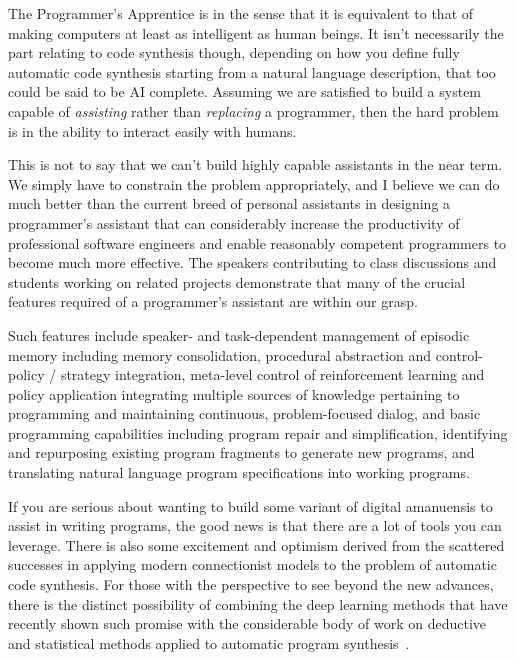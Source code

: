 The Programmer's Apprentice is {} in the sense that it is equivalent to that of making computers at least as intelligent as human beings. It isn't necessarily the part relating to code synthesis \emdash{} though, depending on how you define fully automatic code synthesis starting from a natural language description, that too could be said to be AI complete. Assuming we are satisfied to build a system capable of {\it{assisting}} rather than {\it{replacing}} a programmer, then the hard problem is in the ability to interact easily with humans.

This is not to say that we can't build highly capable assistants in the near term. We simply have to constrain the problem appropriately, and I believe we can do much better than the current breed of personal assistants in designing a programmer's assistant that can considerably increase the productivity of professional software engineers and enable reasonably competent programmers to become much more effective. The speakers contributing to class discussions and students working on related projects demonstrate that many of the crucial features required of a programmer's assistant are within our grasp.

Such features include speaker- and task-dependent management of episodic memory including memory consolidation, procedural abstraction and control-policy / strategy integration, meta-level control of reinforcement learning and policy application integrating multiple sources of knowledge pertaining to programming and maintaining continuous, problem-focused dialog, and basic programming capabilities including program repair and simplification, identifying and repurposing existing program fragments to generate new programs, and translating natural language program specifications into working programs.

If you are serious about wanting to build some variant of digital amanuensis to assist in writing programs, the good news is that there are a lot of tools you can leverage. There is also some excitement and optimism derived from the scattered successes in applying modern connectionist models to the problem of automatic code synthesis. For those with the perspective to see beyond the new advances, there is the distinct possibility of combining the deep learning methods that have recently shown such promise with the considerable body of work on deductive and statistical methods applied to automatic program synthesis~\cite{GulwanietalFaTiPL-17}. 

